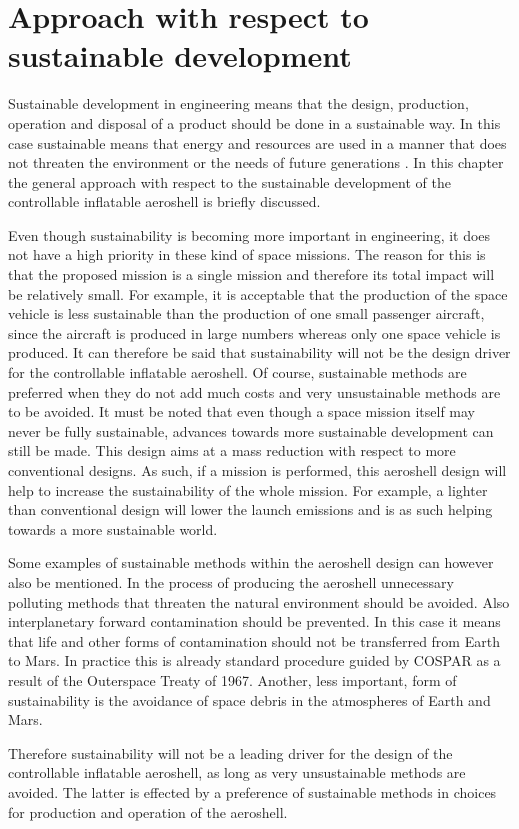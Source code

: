 \section{Approach with respect to sustainable development}\label{cha:sustain}
Sustainable development in engineering means that the design, production, operation and disposal of a product should be done in a sustainable way. In this case sustainable means that energy and resources are used in a manner that does not threaten the environment or the needs of future generations \cite{sustain}. In this chapter the general approach with respect to the sustainable development of the controllable inflatable aeroshell is briefly discussed.

Even though sustainability is becoming more important in engineering, it does not have a high priority in these kind of space missions. The reason for this is that the proposed mission is a single mission and therefore its total impact will be relatively small. For example, it is acceptable that the production of the space vehicle is less sustainable than the production of one small passenger aircraft, since the aircraft is produced in large numbers whereas only one space vehicle is produced. It can therefore be said that sustainability will not be the design driver for the controllable inflatable aeroshell. Of course, sustainable methods are preferred when they do not add much costs and very unsustainable methods are to be avoided. It must be noted that even though a space mission itself may never be fully sustainable, advances towards more sustainable development can still be made. This design aims at a mass reduction with respect to more conventional designs. As such, if a mission is performed, this aeroshell design will help to increase the sustainability of the whole mission. For example, a lighter than conventional design will lower the launch emissions and is as such helping towards a more sustainable world.

Some examples of sustainable methods within the aeroshell design can however also be mentioned. In the process of producing the aeroshell unnecessary polluting methods that threaten the natural environment should be avoided. Also interplanetary forward contamination should be prevented. In this case it means that life and other forms of contamination should not be transferred from Earth to Mars. In practice this is already standard procedure guided by COSPAR as a result of the Outerspace Treaty of 1967. \cite{treaty} Another, less important, form of sustainability is the avoidance of space debris in the atmospheres of Earth and Mars.

Therefore sustainability will not be a leading driver for the design of the controllable inflatable aeroshell, as long as very unsustainable methods are avoided. The latter is effected by a preference of sustainable methods in choices for production and operation of the aeroshell.